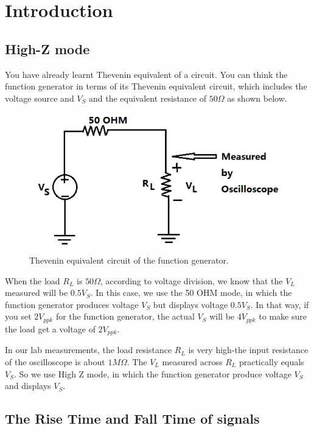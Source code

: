 \documentclass{article}
\begin{document}
\section{Introduction\label{intro}}

\subsection{High-Z mode}

You have already learnt Thevenin equivalent of a circuit. You can think the function generator in terms of its Thevenin equivalent circuit, which includes the voltage source and $V_S$ and the equivalent resistance of $50\Omega$ as shown below.

\begin{figure}[H]\centering
    \includegraphics[scale=1.0]{highz.png}
    \caption{Thevenin equivalent circuit of the function generator.}
\end{figure}

When the load $R_L$ is $50\Omega$, according to voltage division, we know that the $V_L$ measured will be $0.5V_S$. In this case, we use the 50 OHM mode, in which the function generator produces voltage $V_S$ but displays voltage $0.5V_S$. In that way, if you set $2V_{ppk}$ for the function generator, the actual $V_S$ will be $4V_{ppk}$ to make sure the load get a voltage of $2V_{ppk}$.

In our lab measurements, the load resistance $R_L$ is very high-the input resistance of the oscilloscope is about $1M\Omega$. The $V_L$ measured across $R_L$ practically equals $V_S$. So we use High Z mode, in which the function generator produce voltage $V_S$ and displays $V_S$.

\subsection{The Rise Time and Fall Time of signals}
\end{document}

